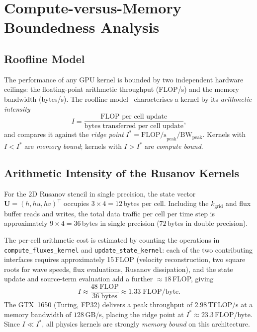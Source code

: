 \documentclass[10pt, conference]{FMFP2023}
\begin{document}
\section{Compute-versus-Memory Boundedness Analysis}
\label{sec:roofline}

\subsection{Roofline Model}

The performance of any GPU kernel is bounded by two
independent hardware ceilings: the floating-point arithmetic
throughput (FLOP/s) and the memory bandwidth (bytes/s).
The roofline model~\cite{Williams2009} characterises a
kernel by its \emph{arithmetic intensity}
\begin{equation}
    I = \frac{\text{FLOP per cell update}}
             {\text{bytes transferred per cell update}},
    \label{eq:arith_intensity}
\end{equation}
and compares it against the \emph{ridge point}
$I^* = \text{FLOP/s}_{\text{peak}}/
\text{BW}_{\text{peak}}$.
Kernels with $I<I^*$ are \emph{memory bound}; kernels
with $I>I^*$ are \emph{compute bound}.

\subsection{Arithmetic Intensity of the Rusanov Kernels}

For the 2D Rusanov stencil in single precision, the state
vector $\bm{U}=(h,hu,hv)^\top$ occupies
$3\times4=12$\,bytes per cell.
Including the $k_{\text{grid}}$ and flux buffer reads and
writes, the total data traffic per cell per time step is
approximately $9\times4=36$\,bytes in single precision
($72$\,bytes in double precision).

The per-cell arithmetic cost is estimated by counting the
operations in \texttt{compute\_fluxes\_kernel} and
\texttt{update\_state\_kernel}: each of the two
contributing interfaces requires approximately 15\,FLOP
(velocity reconstruction, two square roots for wave speeds,
flux evaluations, Rusanov dissipation), and the state update
and source-term evaluation add a further $\approx18$\,FLOP,
giving
\begin{equation}
    I \approx \frac{48\;\text{FLOP}}{36\;\text{bytes}}
            \approx 1.33\;\text{FLOP/byte}.
    \label{eq:intensity_val}
\end{equation}
The GTX~1650 (Turing, FP32) delivers a peak throughput of
$2.98$\,TFLOP/s at a memory bandwidth of $128$\,GB/s,
placing the ridge point at $I^*\approx23.3$\,FLOP/byte.
Since $I\ll I^*$, all physics kernels are strongly
\emph{memory bound} on this architecture.
\end{document}
